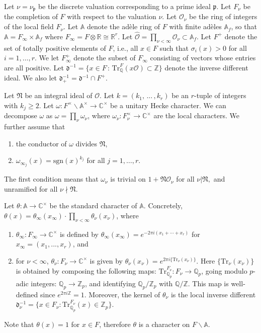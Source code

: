 \documentclass[reqno]{amsart}
\theoremstyle{plain}
\theoremstyle{definition}
\theoremstyle{remark}
\def\Q{\mathbb{Q}}
\def\gp{\mathfrak{p}}
\def\A{\mathbbm A}
\def\Q{\mathbb Q}
\def\A{\mathbb A}
\def\gp{\mathfrak p}
\begin{document}
Let $\nu=\nu_{\gp}$ be the discrete valuation corresponding to a prime ideal $\gp$. Let $F_\nu$ be the completion of $F$ with respect to the valuation $\nu$. Let $\mathcal{O}_\nu $ be the ring of integers of the local field $F_\nu.$
Let $\A$ denote the ad\`ele ring of $F$ with finite ad\`eles $\A_{f}$, so that $\A=F_{\infty} \times \A_{f}$ where $F_\infty =F \otimes \mathbb{R} \cong \mathbb{R}^r$. Let $\hat{\mathcal{O}}=\prod_{\nu<\infty} \mathcal{O}_\nu \subset \A_f.$ Let $F^+$ denote the set of totally positive elements of $F$, i.e., all $x\in F$ such that $\sigma_i(x)>0 $ for all $i=1, \dots, r$.  We let $F^+_\infty$ denote the subset of $F_\infty$ consisting of vectors whose entries are all positive. Let $\mathfrak{d} ^{-1}=\{x\in F \, : \,  \mathrm{Tr}_{\mathbb{Q}}^{F}  (x\mathcal{O})\subset \mathbb{Z}  \}$
denote the inverse different ideal. We also let $\mathfrak{d}_+^{-1}=\mathfrak{d}^{-1}\cap F^+$.

Let $\mathfrak{N}$ be an integral ideal of $\mathcal{O}$. Let $k=(k_1,\,...\,,k_r) $ be an $r$-tuple of integers with $k_j\geq 2$. Let $\omega : F^\times \backslash \A^\times \rightarrow \mathbb{C}^\times$ be a unitary Hecke character. We can decompose $\omega$ as $\omega=\prod_\nu \omega_\nu$, where $\omega_\nu: F_\nu^\times \to \mathbb C^\times$ are the local characters. We further assume that
\begin{enumerate}
\item the conductor of $\omega$ divides $\mathfrak{N}$,
\item $\omega_{\infty_j}(x)=\mathrm{sgn} (x)^{k_j} $ for all $j=1,\dots, r$.
\end{enumerate}
The first condition means that $\omega_\nu $ is trivial on $1+\mathfrak{N} \mathcal{O}_\nu$ for all $\nu | \mathfrak{N},$ and unramified for all $\nu \nmid \mathfrak{N} .$


 Let $\theta : \A \rightarrow \mathbb{C}^\times$ be the standard character of $\A$. Concretely, $\theta (x) = \theta_\infty (x_\infty) \cdot \prod_{\nu < \infty} \theta_\nu (x_\nu)$, where 
 \begin{enumerate}
\item $\theta_\infty: F_\infty \to \mathbb C^\times$ is defined by $\theta_\infty (x_\infty)=e^{-2\pi i( x_1+ \cdots +x_r)}$ for $x_\infty = (x_1,...,x_r) $, and
 \item for $\nu<\infty$, $\theta_\nu : F_\nu \rightarrow \mathbb{C}^\times$ is given by  $\theta_\nu (x_\nu)=e^{2\pi i \{\mathrm{Tr}_\nu (x_\nu)\}}$.  
 Here $\{\mathrm{Tr}_\nu (x_\nu)\}$ is obtained by composing the following maps: $\mathrm{Tr}_{\Q_p}^{F_\nu} : F_\nu \to \Q_p$, going modulo $p$-adic integers: $\Q_p \to \mathbb Z_p$, and identifying $\Q_p/\mathbb Z_p$ with $\Q/\mathbb Z$. This map is well-defined since $e^{2\pi i \mathbb Z} = 1$.  Moreover, the kernel of $\theta_\nu$ is the local inverse different $\mathfrak{d}_\nu^{-1}=\{x\in F_\nu :  \mathrm{Tr}_{\mathbb{Q}_p}^{F_\nu}  (x)\in \mathbb{Z}_p\}$. 
 \end{enumerate}
Note that $\theta(x)=1$ for $x\in F$, therefore $\theta$ is a character on $F \backslash \A$. 
\end{document}
